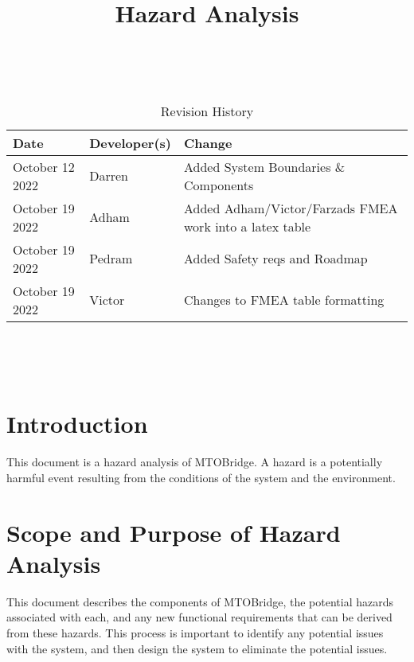 \documentclass{article}
\title{Hazard Analysis\\\progname}
\author{\authname}
\date{}
\begin{document}
\maketitle
\thispagestyle{empty}

~\newpage


\begin{table}[hp]
\caption{Revision History} \label{TblRevisionHistory}
\begin{tabularx}{\textwidth}{llX}
\toprule
\textbf{Date} & \textbf{Developer(s)} & \textbf{Change}\\
\midrule
October 12 2022 & Darren & Added System Boundaries \& Components\\
October 19 2022& Adham & Added Adham/Victor/Farzads FMEA work into a latex table\\
October 19 2022& Pedram & Added Safety reqs and Roadmap\\
October 19 2022& Victor & Changes to FMEA table formatting\\

\bottomrule
\end{tabularx}
\end{table}

~\newpage

\tableofcontents

\listoftables

~\newpage




\section{Introduction}

This document is a hazard analysis of MTOBridge. A hazard is a potentially harmful event resulting
from the conditions of the system and the environment.

\section{Scope and Purpose of Hazard Analysis}

This document describes the components of MTOBridge, the potential hazards associated with each, and 
any new functional requirements that can be derived from these hazards. This process is important to 
identify any potential issues with the system, and then design the system to eliminate the potential issues.
\end{document}
